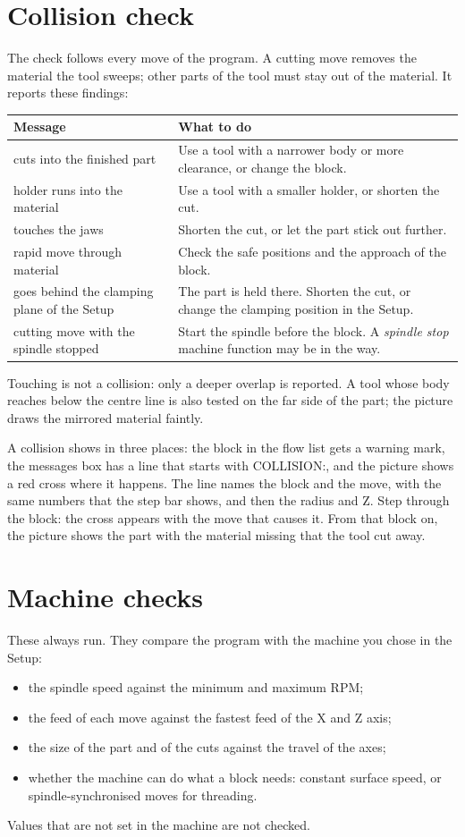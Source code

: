 \section{Collision check}\label{sec:checking:collision}
The check follows every move of the program. A cutting move removes the material the tool sweeps; other parts of the tool must stay out of the material. It reports these findings:
\begin{center}
\begin{tabularx}{\textwidth}{@{}l Y@{}}
\toprule
\textbf{Message} & \textbf{What to do} \\
\midrule
cuts into the finished part & Use a tool with a narrower body or more clearance, or change the block. \\
holder runs into the material & Use a tool with a smaller holder, or shorten the cut. \\
touches the jaws & Shorten the cut, or let the part stick out further. \\
rapid move through material & Check the safe positions and the approach of the block. \\
goes behind the clamping plane of the Setup & The part is held there. Shorten the cut, or change the clamping position in the Setup. \\
cutting move with the spindle stopped & Start the spindle before the block. A \emph{spindle stop} machine function may be in the way. \\
\bottomrule
\end{tabularx}
\end{center}
Touching is not a collision: only a deeper overlap is reported. A tool whose body reaches below the centre line is also tested on the far side of the part; the picture draws the mirrored material faintly.

A collision shows in three places: the block in the flow list gets a warning mark, the messages box has a line that starts with \textsf{COLLISION:}, and the picture shows a red cross where it happens. The line names the block and the move, with the same numbers that the step bar shows, and then the radius and Z. Step through the block: the cross appears with the move that causes it. From that block on, the picture shows the part with the material missing that the tool cut away.

\section{Machine checks}
These always run. They compare the program with the machine you chose in the Setup:
\begin{itemize}
  \item the spindle speed against the minimum and maximum RPM;
  \item the feed of each move against the fastest feed of the X and Z axis;
  \item the size of the part and of the cuts against the travel of the axes;
  \item whether the machine can do what a block needs: constant surface speed, or spindle-synchronised moves for threading.
\end{itemize}
Values that are not set in the machine are not checked.

